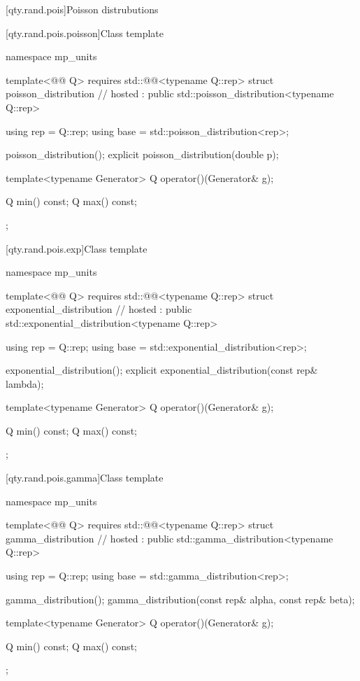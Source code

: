 [qty.rand.pois]{Poisson distrubutions}

[qty.rand.pois.poisson]{Class template }

\begin{codeblock}
namespace mp_units {
template<@@ Q>
  requires std::@@<typename Q::rep>
struct poisson_distribution                                                             // hosted
    : public std::poisson_distribution<typename Q::rep> {
  using rep = Q::rep;
  using base = std::poisson_distribution<rep>;

  poisson_distribution();
  explicit poisson_distribution(double p);

  template<typename Generator>
  Q operator()(Generator& g);

  Q min() const;
  Q max() const;
};
}
\end{codeblock}

[qty.rand.pois.exp]{Class template }

\begin{codeblock}
namespace mp_units {
template<@@ Q>
  requires std::@@<typename Q::rep>
struct exponential_distribution                                                         // hosted
    : public std::exponential_distribution<typename Q::rep> {
  using rep = Q::rep;
  using base = std::exponential_distribution<rep>;

  exponential_distribution();
  explicit exponential_distribution(const rep& lambda);

  template<typename Generator>
  Q operator()(Generator& g);

  Q min() const;
  Q max() const;
};
}
\end{codeblock}

[qty.rand.pois.gamma]{Class template }

\begin{codeblock}
namespace mp_units {
template<@@ Q>
  requires std::@@<typename Q::rep>
struct gamma_distribution                                                               // hosted
    : public std::gamma_distribution<typename Q::rep> {
  using rep = Q::rep;
  using base = std::gamma_distribution<rep>;

  gamma_distribution();
  gamma_distribution(const rep& alpha, const rep& beta);

  template<typename Generator>
  Q operator()(Generator& g);

  Q min() const;
  Q max() const;
};
}
\end{codeblock}

